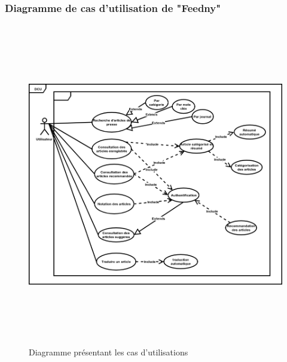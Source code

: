 \subsubsection{Diagramme de cas d'utilisation de "Feedny"}
	\begin{figure}[H]
	\centering
	\includegraphics[height=400pt,width=350pt]{img/chapter3/diagcasdutilisation.png}
	\caption{Diagramme présentant les cas d'utilisations}
    \end{figure}

